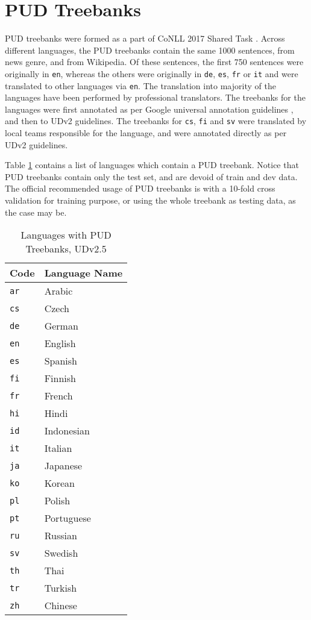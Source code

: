 \newpage

\section{PUD Treebanks}
\label{app:pud}

PUD treebanks were formed as a part of CoNLL 2017 Shared Task \citep{ud-shared-task}. Across different languages, the PUD treebanks contain the same 1000 sentences, from news genre, and from Wikipedia. Of these sentences, the first 750 sentences were originally in \verb|en|, whereas the others were originally in \verb|de|, \verb|es|, \verb|fr| or \verb|it| and were translated to other languages via \verb|en|. The translation into majority of the languages have been performed by professional translators. The treebanks for the languages were first annotated as per Google universal annotation guidelines \cite{google}, and then to UDv2 guidelines. The treebanks for \verb|cs|, \verb|fi| and \verb|sv| were translated by local teams responsible for the language, and were annotated directly as per UDv2 guidelines.

Table \ref{tab:pud} contains a list of languages which contain a PUD treebank. Notice that PUD treebanks contain only the test set, and are devoid of train and dev data. The official recommended usage of PUD treebanks is with a 10-fold cross validation for training purpose, or using the whole treebank as testing data, as the case may be.

\begin{table}[h]
    \centering
    \begin{tabular}{|l|l|}
    \hline
    \textbf{Code} & \textbf{Language Name} \\
    \hline \hline
\texttt{ar} & Arabic \\
\texttt{cs} & Czech \\
\texttt{de} & German \\
\texttt{en} & English \\
\texttt{es} & Spanish \\
\texttt{fi} & Finnish \\
\texttt{fr} & French \\
\texttt{hi} & Hindi \\
\texttt{id} & Indonesian \\
\texttt{it} & Italian \\
\texttt{ja} & Japanese \\
\texttt{ko} & Korean \\
\texttt{pl} & Polish \\
\texttt{pt} & Portuguese \\
\texttt{ru} & Russian \\
\texttt{sv} & Swedish \\
\texttt{th} & Thai \\
\texttt{tr} & Turkish \\
\texttt{zh} & Chinese \\
    \hline
    \end{tabular}
    \caption{Languages with PUD Treebanks, UDv2.5}
    \label{tab:pud}
\end{table}

